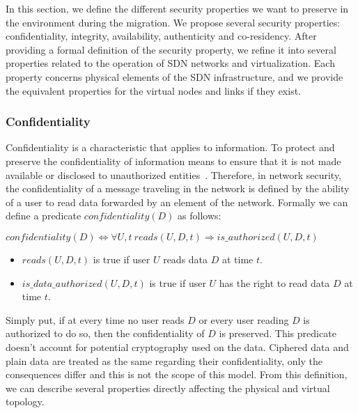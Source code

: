 \label{sec:security_prop}
In this section, we define the different security properties we want to preserve in the environment during the migration.
We propose several security properties: confidentiality, integrity, availability, authenticity and co-residency.
After providing a formal definition of the security property, we refine it into several properties related to the operation of SDN networks and virtualization. Each property concerns physical elements of the SDN infrastructure, and we provide the equivalent properties for the virtual nodes and links if they exist. 

\subsubsection{Confidentiality}
\label{sec:prop-conf}
Confidentiality is a characteristic that applies to information.
To protect and preserve the confidentiality of information means to ensure that it is not made available or disclosed to unauthorized entities~\cite{ISO/IEC270012013}.
Therefore, in network security, the confidentiality of a message traveling in the network is defined by the ability of a user to read data forwarded by an element of the network.
Formally we can define a predicate $confidentiality(D)$ as follows:

\begin{myformula}
$ confidentiality(D) \Leftrightarrow \forall U,t~reads(U,D,t) \Rightarrow is\_authorized(U,D,t)$
\end{myformula}

\begin{itemize}
\item $reads(U,D,t)$ is true if user $U$ reads data $D$ at time $t$.
\item $is\_data\_authorized(U,D,t)$ is true if user $U$ has the right to read data $D$ at time $t$.
\end{itemize}
Simply put, if at every time no user reads $D$ or every user reading $D$ is authorized to do so, then the confidentiality of $D$ is preserved.
This predicate doesn't account for potential cryptography used on the data.
Ciphered data and plain data are treated as the same regarding their confidentiality, only the consequences differ and this is not the scope of this model.
From this definition, we can describe several properties directly affecting the physical and virtual topology.



